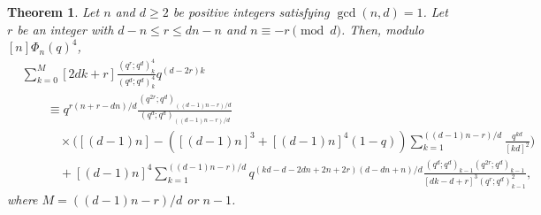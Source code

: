 \documentclass[10pt,a4paper]{amsart}
\newtheorem{thm}{Theorem}
\begin{document}
\begin{thm}\label{thm:main-2}
    Let $n$ and $d\geqslant2$ be positive integers satisfying $\gcd(n,d)=1$. Let $r$ be an integer with $d-n\leqslant r \leqslant dn-n$ and 
    $n\equiv -r \pmod{d} $. Then, modulo $[n]\Phi_{n}(q)^4$,
    \begin{align*}
        &\sum_{k=0}^{M}[2dk+r]\frac{(q^r;q^d)_k^4}{(q^d;q^d)_k^4}q^{(d-2r)k}\nonumber\\
        &\hspace{2em}\equiv q^{r(n+r-dn)/d}\frac{(q^{2r};q^d)_{((d-1)n-r)/d}}{(q^{d};q^d)_{((d-1)n-r)/d}}\nonumber\\
        &\hspace{3em}\times\Bigg([(d-1)n]-([(d-1)n]^3+[(d-1)n]^4(1-q))\sum_{k=1}^{((d-1)n-r)/d}\frac{q^{kd}}{[kd]^2}\Bigg)\nonumber\\
        &\hspace{3em}+[(d-1)n]^4\sum_{k=1}^{((d-1)n-r)/d}q^{(kd-d-2dn+2n+2r)(d-dn+n)/d}\frac{(q^d;q^d)_{k-1}(q^{2r};q^d)_{k-1}}{[dk-d+r]^3(q^r;q^d)_{k-1}^2},
    \end{align*}
    where $M=((d-1)n-r)/d$ or $n-1$.
\end{thm}
\end{document}

